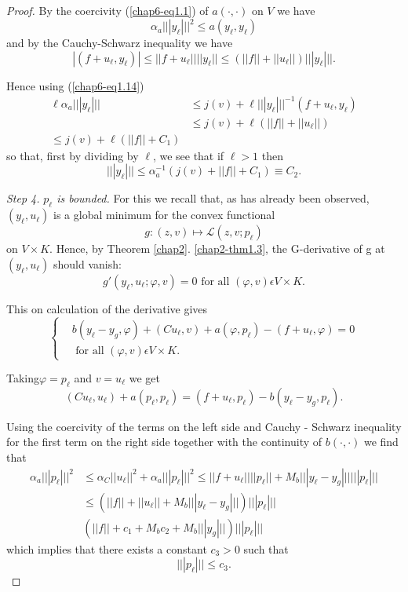 \begin{proof}
By the coercivity (\ref{chap6-eq1.1}) of $a(\cdot , \cdot)$ on $V$ we have
$$
\alpha_{a} |||y_{\ell}|||^{2} \leq a (y_{\ell}, y_{\ell})
$$
and by the Cauchy-Schwarz inequality we have
$$
|(f + u_{\ell}, y_{\ell})| \leq ||f+u_{\ell}|| ||y_{\ell}|| \leq (||f|| + ||u_{\ell}||) |||y_{\ell}|||.
$$

Hence using (\ref{chap6-eq1.14})
\begin{align*}
\ell \alpha _{a} |||y_{\ell}||| & \leq j(v) + \ell|||y_{\ell}|||^{-1} (f+u_{\ell}, y_{\ell})\\
& \leq j(v) + \ell(||f|| + ||u_{\ell}||)\\
\leq j(v) + \ell (||f|| + C_{1})
\end{align*}
so that, first by dividing by $\ell$, we see that if $\ell > 1$ then 
\begin{equation*}
|||y_{\ell}||| \leq \alpha_{a}^{-1} (j(v) + ||f|| + C_{1}) \equiv
C_{2}. \tag{1.15}\label{chap6-eq1.15}
\end{equation*}

{\em Step 4.} {\em $p_{\ell}$ is bounded.} For this we recall that, as
has already been observed, $(y_{\ell}, u_{\ell})$ is a global minimum
for the convex functional 
$$
g : (z, v) \mapsto \mathscr{L} (z, v ; p_{\ell})
$$
on $V \times K$. Hence, by Theorem \ref{chap2}. \ref{chap2-thm1.3}, the G-derivative of g at $(y_{\ell}, u_{\ell})$ should vanish:
$$
g'(y_{\ell}, u_{\ell} ; \varphi , v) = 0 \text{ for all } (\varphi, v) \epsilon V \times K.
$$

This on calculation of the derivative gives
\begin{equation*}
\begin{cases}
& b(y_{\ell} - y_{g}, \varphi) + (Cu_{\ell}, v) + a(\varphi, p_{\ell}) - (f+u_{\ell}, \varphi) = 0\\
& \text{ for all } (\varphi, v) \epsilon V \times K.
\end{cases}
\end{equation*}

Taking\pageoriginale $\varphi = p_{\ell}$ and $v = u_{\ell}$ we get
$$
(Cu_{\ell}, u_{\ell}) + a(p_{\ell}, p_{\ell}) = (f+u_{\ell}, p_{\ell}) - b(y_{\ell} - y_{g}, p_{\ell}).
$$

Using the coercivity of the terms on the left side and Cauchy - Schwarz
inequality for the first term on the right side together with the
continuity of $b(\cdot , \cdot)$ we find that  
\begin{align*}
\alpha_{a} |||p_{\ell}|||^{2} & \leq \alpha_{C} ||u_{\ell}||^{2} + \alpha_{a} |||p_{\ell}|||^{2} \leq ||f+u_{\ell}|| ||p_{\ell}|| + M_{b} |||y_{\ell} - y_{g} ||| |||p_{\ell} |||\\
& \leq (||f|| + ||u_{\ell}|| + M_{b} |||y_{\ell} - y_{g}|||) |||p_{\ell}|||\\
& (||f|| + c_{1} + M_{b} c_{2} + M_{b} |||y_{g}|||) |||p_{\ell}|||
\end{align*}
which implies that there exists a constant $c_{3} > 0$ such that
\begin{equation*}
|||p_{\ell}||| \leq c_{3}.\tag{1.16}\label{chap6-eq1.16}
\end{equation*}


\end{proof}
